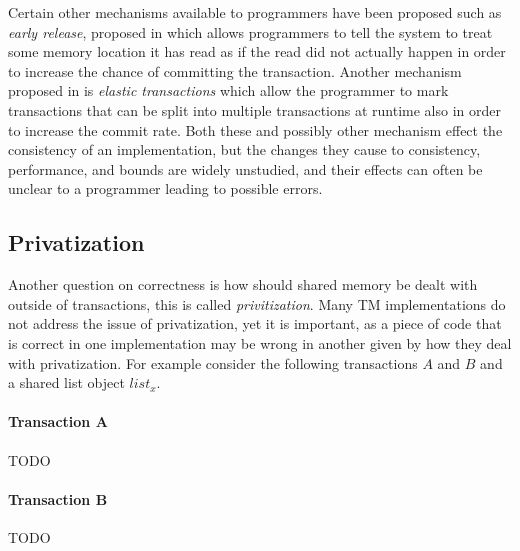 Certain other mechanisms available to programmers have been proposed such as \emph{early release}, proposed in \cite{872048} which allows programmers to tell the system to treat some memory location it has read as if the read did not actually happen in order to increase the chance of committing the transaction.
Another mechanism proposed in \cite{LPD-REPORT-2009-002} is \emph{elastic transactions} which allow the programmer to mark transactions that can be split into multiple transactions at runtime also in order to increase the commit rate.
Both these and possibly other mechanism effect the consistency of an implementation, but the changes they cause to consistency, performance, and bounds are widely unstudied, and their effects can often be unclear to a programmer leading to possible errors.

\subsection{Privatization}
Another question on correctness is how should shared memory be dealt with outside of transactions, this is called \emph{privitization}.
Many TM implementations do not address the issue of privatization, yet it is important, as a piece of code that is correct in one implementation may be wrong in another given by how they deal with privatization.  For example consider the following transactions $A$ and $B$ and a shared list object $list_x$.

\paragraph{Transaction A}
TODO

\paragraph{Transaction B}
TODO

